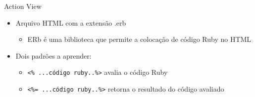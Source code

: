 \begin{frame}{Action View}
	\begin{itemize}
		\item Arquivo HTML com a extensão .erb
		\begin{itemize}
			\item ERb é uma biblioteca que permite a colocação de código Ruby no HTML
		\end{itemize}

		\item Dois padrões a aprender:
		\begin{itemize}
			\item  \verb|<% ...código ruby..%>| avalia o código Ruby
			\item  \verb|<%= ...código ruby..%>| retorna o resultado do código avaliado 
		\end{itemize}		
	\end{itemize}	
\end{frame}
